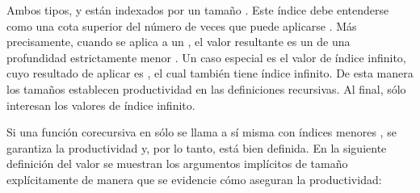 
Ambos tipos,  y  están indexados por un tamaño . Este índice debe entenderse como una cota superior del número de veces que puede aplicarse . Más precisamente, cuando se aplica  a un  \AgdaSymbol{:}  , el valor resultante es un  \AgdaSymbol{:}   de una profundidad estrictamente menor  \AgdaSymbol{<} . Un caso especial es el valor  \AgdaSymbol{:}  \AgdaArgument{$\infty$} de índice infinito, cuyo resultado de aplicar  es  \AgdaSymbol{:}  \AgdaArgument{$\infty$}, el cual también tiene índice infinito. De esta manera los tamaños establecen productividad en las definiciones recursivas. Al final, sólo interesan los valores  \AgdaSymbol{:}  \AgdaArgument{$\infty$} de índice infinito.

Si una función corecursiva en   sólo se llama a sí misma con índices menores  \AgdaSymbol{<} , se garantiza la productividad y, por lo tanto, está bien definida. En la siguiente definición del valor  se muestran los argumentos implícitos de tamaño explícitamente de manera que se evidencie cómo aseguran la productividad:

